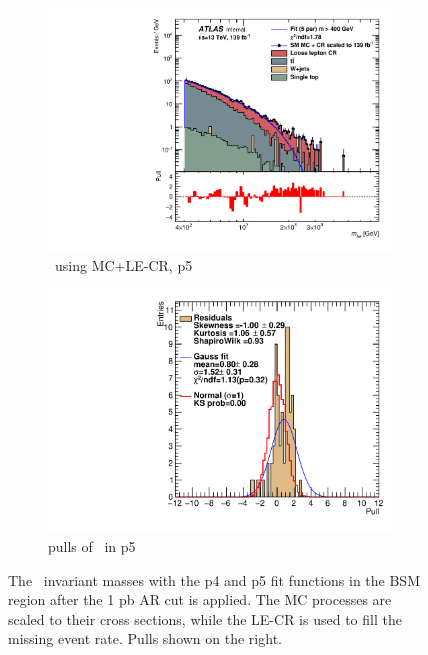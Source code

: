 \begin{figure}[ht]
\begin{subfigure}[h]{0.38\linewidth}
    \includegraphics[scale=0.3]{figs/ch6/fit/variable_nosmooth/p5/1PB/output_SMMCplusCR_Mbe_p5.pdf}%
     \caption{\mbe \ using MC+LE-CR, p5}
     \end{subfigure}
     \hfill
    \begin{subfigure}[h]{0.4\linewidth}
    \includegraphics[scale=0.32]{figs/ch6/fit/variable_nosmooth/p5/1PB/pull_SMMCplusCR_Mbe_p5.pdf}%
    \caption{pulls of \mbe \ in p5}
    \end{subfigure}
    \caption{The \mbe \ invariant masses with the p4 and p5 fit functions in the BSM region after the 1 pb AR cut is applied. The MC processes are scaled to their cross sections, while the LE-CR is used to fill the missing event rate. Pulls shown on the right.}
\label{fig:mbe-fit-pulls-1pb}
\end{figure}

